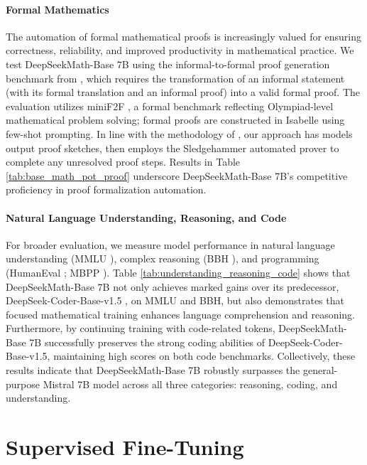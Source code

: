 \paragraph{Formal Mathematics}

The automation of formal mathematical proofs is increasingly valued for ensuring correctness, reliability, and improved productivity in mathematical practice. We test DeepSeekMath-Base 7B using the informal-to-formal proof generation benchmark from \citep{dsp_proof}, which requires the transformation of an informal statement (with its formal translation and an informal proof) into a valid formal proof. The evaluation utilizes miniF2F \citep{minif2f}, a formal benchmark reflecting Olympiad-level mathematical problem solving; formal proofs are constructed in Isabelle using few-shot prompting. In line with the methodology of \cite{dsp_proof}, our approach has models output proof sketches, then employs the Sledgehammer automated prover \citep{sledgehammer} to complete any unresolved proof steps. Results in Table \ref{tab:base_math_pot_proof} underscore DeepSeekMath-Base 7B’s competitive proficiency in proof formalization automation.

\paragraph{Natural Language Understanding, Reasoning, and Code}

For broader evaluation, we measure model performance in natural language understanding (MMLU \citep{mmlu}), complex reasoning (BBH \citep{bbh}), and programming (HumanEval \citep{codex}; MBPP \citep{mbpp}). Table \ref{tab:understanding_reasoning_code} shows that DeepSeekMath-Base 7B not only achieves marked gains over its predecessor, DeepSeek-Coder-Base-v1.5 \citep{deepseek-coder}, on MMLU and BBH, but also demonstrates that focused mathematical training enhances language comprehension and reasoning. Furthermore, by continuing training with code-related tokens, DeepSeekMath-Base 7B successfully preserves the strong coding abilities of DeepSeek-Coder-Base-v1.5, maintaining high scores on both code benchmarks. Collectively, these results indicate that DeepSeekMath-Base 7B robustly surpasses the general-purpose Mistral 7B model \citep{mistral} across all three categories: reasoning, coding, and understanding.

\section{Supervised Fine-Tuning}

